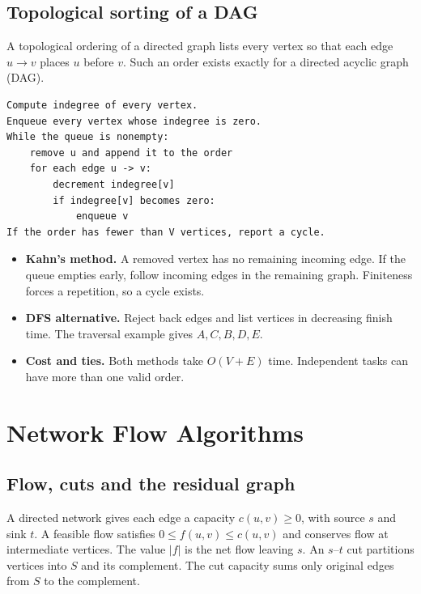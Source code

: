 \documentclass[12pt,a4paper]{article}
\begin{document}
\subsection{Topological sorting of a DAG}
\begin{tcolorbox}[defbox, title={Topological order}]
A topological ordering of a directed graph lists every vertex so that each edge $u\to v$ places $u$ before $v$. Such an order exists exactly for a directed acyclic graph (DAG).
\end{tcolorbox}

\begin{tcolorbox}[formulabox, title={Kahn's indegree algorithm}]
\begin{verbatim}
Compute indegree of every vertex.
Enqueue every vertex whose indegree is zero.
While the queue is nonempty:
    remove u and append it to the order
    for each edge u -> v:
        decrement indegree[v]
        if indegree[v] becomes zero:
            enqueue v
If the order has fewer than V vertices, report a cycle.
\end{verbatim}
\end{tcolorbox}

\begin{itemize}[leftmargin=*, itemsep=2pt]
  \item \textbf{Kahn's method.} A removed vertex has no remaining incoming edge. If the queue empties early, follow incoming edges in the remaining graph. Finiteness forces a repetition, so a cycle exists.
  \item \textbf{DFS alternative.} Reject back edges and list vertices in decreasing finish time. The traversal example gives $A,C,B,D,E$.
  \item \textbf{Cost and ties.} Both methods take $O(V+E)$ time. Independent tasks can have more than one valid order.
\end{itemize}

\section{Network Flow Algorithms}
\subsection{Flow, cuts and the residual graph}
\begin{tcolorbox}[defbox, title={Feasible flow}]
A directed network gives each edge a capacity $c(u,v)\ge0$, with source $s$ and sink $t$. A feasible flow satisfies $0\le f(u,v)\le c(u,v)$ and conserves flow at intermediate vertices. The value $|f|$ is the net flow leaving $s$. An $s$--$t$ cut partitions vertices into $S$ and its complement. The cut capacity sums only original edges from $S$ to the complement.
\end{tcolorbox}
\end{document}
